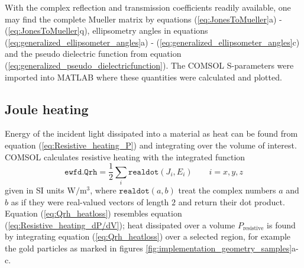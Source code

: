 With the complex reflection and transmission coefficients readily available, one may find the complete Mueller matrix by equations (\ref{eq:JonesToMueller}a) - (\ref{eq:JonesToMueller}q), ellipsometry angles in equations (\ref{eq:generalized_ellipsometer_angles}a) - (\ref{eq:generalized_ellipsometer_angles}c) and the pseudo dielectric function from equation (\ref{eq:generalized_pseudo_dielectricfunction}). The COMSOL S-parameters were imported into MATLAB where these quantities were calculated and plotted.

\subsection{Joule heating}
Energy of the incident light dissipated into a material as heat can be found from equation (\ref{eq:Resistive_heating_P}) and integrating over the volume of interest. COMSOL calculates resistive heating with the integrated function 
\begin{equation}
    \texttt{ewfd.Qrh} = \frac{1}{2}\sum_i \texttt{realdot}(J_i,E_i) \quad\quad i=x,y,z
    \label{eq:Qrh_heatloss}
\end{equation}
given in SI units W$/$m$^3$, where $\texttt{realdot}(a,b)$ treat the complex numbers $a$ and $b$ as if they were real-valued vectors of length $2$ and return their dot product\cite{comsol_referencemanual}. Equation (\ref{eq:Qrh_heatloss}) resembles equation (\ref{eq:Resistive_heating_dP/dV}); heat dissipated over a volume $P_{\text{resistive}}$ is found by integrating equation (\ref{eq:Qrh_heatloss}) over a selected region, for example the gold particles as marked in figures \ref{fig:implementation_geometry_samples}a-c.

